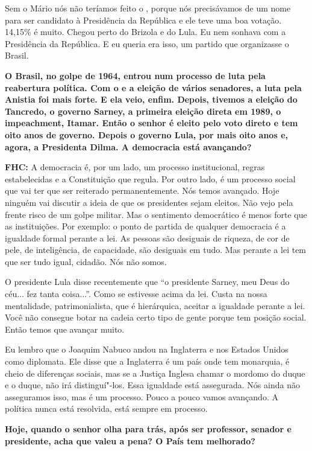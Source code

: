 Sem o Mário nós não teríamos feito o , porque nós precisávamos de um
nome para ser candidato à Presidência da República e ele teve uma boa
votação. 14,15\% é muito. Chegou perto do Brizola e do Lula. Eu nem
sonhava com a Presidência da República. E eu queria era isso, um partido
que organizasse o Brasil.

\textbf{O Brasil, no golpe de 1964, entrou num processo de luta pela
reabertura política. Com o  e a eleição de vários senadores, a luta
pela Anistia foi mais forte. E ela veio, enfim. Depois, tivemos a
eleição do Tancredo, o governo Sarney, a primeira eleição direta em
1989, o impeachment, Itamar. Então o senhor é eleito pelo voto direto e
tem oito anos de governo. Depois o governo Lula, por mais oito anos e,
agora, a Presidenta Dilma. A democracia está avançando?}

\textbf{FHC:} A democracia é, por um lado, um processo institucional,
regras estabelecidas e a Constituição que regula. Por outro lado, é um
processo social que vai ter que ser reiterado permanentemente. Nós temos
avançado. Hoje ninguém vai discutir a ideia de que os presidentes sejam
eleitos. Não vejo pela frente risco de um golpe militar. Mas o
sentimento democrático é menos forte que as instituições. Por exemplo: o
ponto de partida de qualquer democracia é a igualdade formal perante a
lei. As pessoas são desiguais de riqueza, de cor de pele, de
inteligência, de capacidade, são desiguais em tudo. Mas perante a lei
tem que ser tudo igual, cidadão. Nós não somos.

O presidente Lula disse recentemente que ``o presidente Sarney, meu Deus
do céu... fez tanta coisa...''. Como se estivesse acima da lei. Custa na
nossa mentalidade, patrimonialista, que é hierárquica, aceitar a
igualdade perante a lei. Você não consegue botar na cadeia certo tipo de
gente porque tem posição social. Então temos que avançar muito.

Eu lembro que o Joaquim Nabuco andou na Inglaterra e nos Estados Unidos
como diplomata. Ele disse que a Inglaterra é um país onde tem monarquia,
é cheio de diferenças sociais, mas se a Justiça Inglesa chamar o mordomo
do duque e o duque, não irá distinguí"-los. Essa igualdade está
assegurada. Nós ainda não asseguramos isso, mas é um processo. Pouco a
pouco vamos avançando. A política nunca está resolvida, está sempre em
processo.

\textbf{Hoje, quando o senhor olha para trás, após ser professor,
senador e presidente, acha que valeu a pena? O País tem melhorado?}

